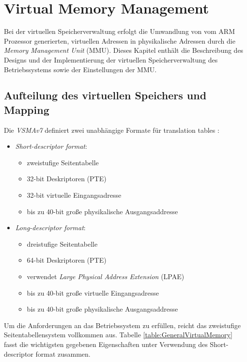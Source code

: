 \section{Virtual Memory Management}

Bei der virtuellen Speicherverwaltung erfolgt die Umwandlung von vom ARM Prozessor generierten, virtuellen Adressen in physikalische Adressen durch die \emph{Memory Management Unit} (MMU). Dieses Kapitel enthält die Beschreibung des Designs und der Implementierung der virtuellen Speicherverwaltung des Betriebssystems sowie der Einstellungen der MMU.\\

\subsection{Aufteilung des virtuellen Speichers und Mapping}

Die \emph{VSMAv7} definiert zwei unabhängige Formate für translation tables \cite[S. B3-1318]{ARM:ARM}:

\begin{itemize}
	\item \emph{Short-descriptor format}:
	\begin{itemize}
		\item zweistufige Seitentabelle 
		\item 32-bit Deskriptoren (PTE)
		\item 32-bit virtuelle Eingangsadresse 
		\item bis zu 40-bit große physikalische Ausgangsaddresse
	\end{itemize}
	\item \emph{Long-descriptor format}:
	\begin{itemize}
		\item dreistufige Seitentabelle
		\item 64-bit Deskriptoren (PTE)
		\item verwendet \emph{Large Physical Address Extension} (LPAE)
		\item bis zu 40-bit große virtuelle Eingangsadresse 
		\item bis zu 40-bit große physikalische Ausgangsaddresse
	\end{itemize}
\end{itemize}

Um die Anforderungen an das Betriebssystem zu erfüllen, reicht das zweistufige Seitentabellensystem vollkommen aus. Tabelle \ref{table:GeneralVirtualMemory} fasst die wichtigsten gegebenen Eigenschaften unter Verwendung des Short-descriptor format zusammen.\\

